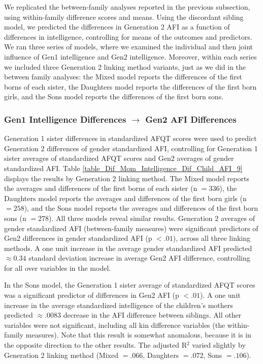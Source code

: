 We replicated the between-family analyses reported in the previous subsection, using within-family difference scores and means. Using the discordant sibling model, we predicted the differences in Generation 2 AFI as a function of differences in intelligence, controlling for means of the outcomes and predictors. We ran three series of models, where we examined the individual and then joint influence of Gen1 intelligence and Gen2 intelligence. Moreover, within each series we included three Generation 2 linking method variants, just as we did in the between family analyses: the Mixed model reports the differences of the first borns of each sister, the Daughters model reports the differences of the first born girls, and the Sons model reports the differences of the first born sons. 

\subsubsection{Gen1 Intelligence Differences $\rightarrow$ Gen2 AFI Differences} 
Generation 1 sister differences in standardized AFQT scores were used to predict Generation 2 differences of gender standardized AFI, controlling for Generation 1 sister averages of standardized AFQT scores and Gen2 averages of gender standardized AFI. Table \ref{table_Dif_Mom_Intelligence_Dif_Child_AFI_9} displays the results by Generation 2 linking method. The Mixed model reports the averages and differences of the first borns of each sister (n $= 336$), the Daughters model reports the averages and differences of the first born girls (n $= 258$), and the Sons model reports the averages and differences of the first born sons (n $= 278$). All three models reveal similar results. Generation 2 averages of gender standardized AFI (between-family measures) were significant predictors of Gen2 differences in gender standardized AFI (p $< .01$), across all three linking methods. A one unit increase in the average gender standardized AFI predicted $\approx 0.34$ standard deviation increase in average Gen2 AFI difference, controlling for all over variables in the model. 

In the Sons model, the Generation 1 sister average of standardized AFQT scores was a significant predictor of differences in Gen2 AFI (p $< .01$). A one unit increase in the average standardized intelligence of the children's mothers predicted $\approx .0083$ decrease in the AFI difference between siblings. All other variables were not significant, including all kin difference variables (the within-family measures). Note that this result is somewhat anomalous, because it is in the opposite direction to the other results. The adjusted R$^{2}$ varied slightly by Generation 2 linking method (Mixed $= .066$, Daughters $= .072$, Sons $= .106$).

